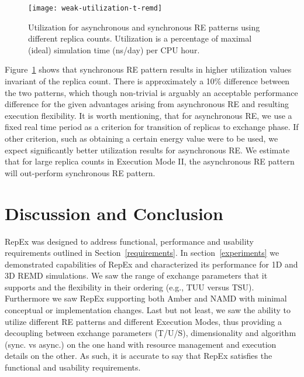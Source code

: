 \documentclass{sig-alternate-05-2015}
\begin{document}
\begin{figure}[ht!]
  \centering
  \texttt{[image: weak-utilization-t-remd]}
  \caption{\small{Utilization for asynchronous and synchronous RE patterns using different replica counts. Utilization is a percentage of maximal (ideal) simulation time (ns/day) per CPU hour.  }
  }
  \label{fig:utilization}
\end{figure}

Figure~\ref{fig:utilization} shows that synchronous RE pattern results in higher utilization values invariant of the replica count.  There is approximately a 10\% difference between the two patterns, which though non-trivial is arguably an acceptable performance difference for the given advantages arising from asynchronous RE and resulting execution flexibility. It is worth mentioning, that for asynchronous RE, we use a fixed real time period as a criterion for transition of replicas to exchange phase. If other criterion, such as obtaining a certain energy value were to be used, we expect significantly better utilization results for asynchronous RE. We estimate that for large replica counts in Execution Mode II, the asynchronous RE pattern will out-perform synchronous RE pattern.

\section{Discussion and Conclusion} \label{discussion}

RepEx was designed to address functional, performance and usability requirements outlined in Section~\ref{requirements}. In section~\ref{experiments} we demonstrated capabilities of RepEx and characterized its performance for 1D and 3D REMD simulations. We saw the range of exchange parameters that it supports and the flexibility in their ordering (e.g., TUU versus TSU). Furthermore we saw RepEx supporting both Amber and NAMD with minimal conceptual or implementation changes. Last but not least, we saw the ability to utilize different RE patterns and different Execution Modes, thus providing a decoupling between exchange parameters (T/U/S), dimensionality and algorithm (sync. vs async.) on the one hand with resource management and execution details on the other. As such, it is accurate to say that RepEx satisfies the functional and usability requirements.
\end{document}
